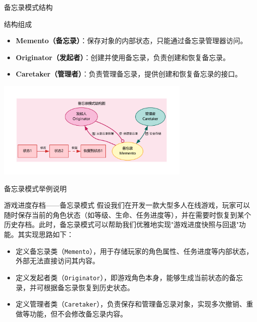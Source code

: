 \documentclass[UTF8,aspectratio=169]{beamer}
\begin{document}
\begin{frame}{备忘录模式结构}
    \begin{ytublock}{结构组成}
        \begin{itemize}
            \item \textbf{Memento（备忘录）}：保存对象的内部状态，只能通过备忘录管理器访问。
            \item \textbf{Originator（发起者）}：创建并使用备忘录，负责创建和恢复备忘录。
            \item \textbf{Caretaker（管理者）}：负责管理备忘录，提供创建和恢复备忘录的接口。
        \end{itemize}
    \end{ytublock}
    \begin{center}
        \includegraphics[width=0.7\textwidth]{images/memento_pattern.pdf}
    \end{center}
\end{frame}

\begin{frame}{备忘录模式举例说明}
    \begin{exampleytublock}{游戏进度存档——备忘录模式}
        假设我们在开发一款大型多人在线游戏，玩家可以随时保存当前的角色状态（如等级、生命、任务进度等），并在需要时恢复到某个历史存档。此时，备忘录模式可以帮助我们优雅地实现"游戏进度快照与回退"功能。其实现思路如下：
        \begin{itemize}
            \item 定义备忘录类（\texttt{Memento}），用于存储玩家的角色属性、任务进度等内部状态，外部无法直接访问其内容。
            \item 定义发起者类（\texttt{Originator}），即游戏角色本身，能够生成当前状态的备忘录，并可根据备忘录恢复到历史状态。
            \item 定义管理者类（\texttt{Caretaker}），负责保存和管理备忘录对象，实现多次撤销、重做等功能，但不会修改备忘录内容。
        \end{itemize}
    \end{exampleytublock}
\end{frame}
\end{document}
